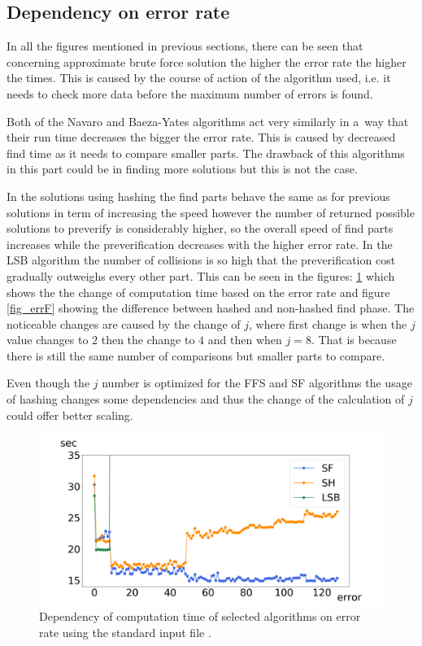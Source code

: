 \subsection{Dependency on error rate} \label{depErrRate}
In all the figures mentioned in previous sections, there can be seen that concerning approximate brute force solution the higher the error rate the higher the times. This is caused by the course of action of the algorithm used, i.e. it needs to check more data before the maximum number of errors is found.

Both of the Navaro and Baeza-Yates algorithms act very similarly in a~way that their run time decreases the bigger the error rate. This is caused by decreased find time as it needs to compare smaller parts. The drawback of this algorithms in this part could be in finding more solutions but this is not the case.

In the solutions using hashing the find parts behave the same as for previous solutions in term of increasing the speed however the number of returned possible solutions to preverify is considerably higher, so the overall speed of find parts increases while the preverification decreases with the higher error rate. In the LSB algorithm the number of collisions is so high that the preverification cost gradually outweighs every other part. This can be seen in the figures: \ref{fig_errA} which shows the the change of computation time based on the error rate and figure \ref{fig_errF} showing the difference between hashed and non-hashed find phase. The noticeable changes are caused by the change of $j$, where first change is when the $j$ value changes to $2$ then the change to $4$ and then when $j=8$. That is because there is still the same number of comparisons but smaller parts to compare.

Even though the $j$ number is optimized for the FFS and SF algorithms the usage of hashing changes some dependencies and thus the change of the calculation of $j$ could offer better scaling.

\begin{figure}[h]
\centering
\includegraphics[width=\textwidth]{img/errorAll}
\caption{Dependency of computation time of selected algorithms on error rate using the standard input file .}
\label{fig_errA}
\end{figure}

